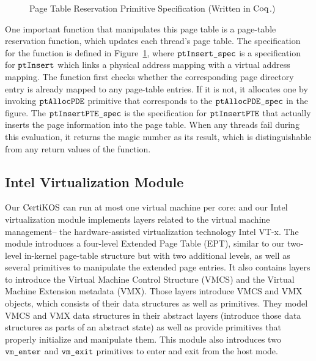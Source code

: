  \begin{figure}
 
\caption{Page Table Reservation Primitive Specification (Written in $\mathrm{Coq}$.)}
\label{fig:chapter:certikos:ptresv-func}
\end{figure}
 One important function that manipulates this page table is a page-table reservation function,
 which updates each thread's page table.
 The specification for the function is defined in Figure~\ref{fig:chapter:certikos:ptresv-func},
  where  ${\mathrm{\texttt{ptInsert\_spec}}}$ is a specification for  ${\mathrm{\texttt{ptInsert}}}$  which links 
a physical address mapping with a virtual address mapping. 
The function first checks whether the corresponding page directory entry is already mapped to any page-table entries.
If it is not, it allocates one by invoking ${\mathrm{\texttt{ptAllocPDE}}}$ primitive that corresponds to the  ${\mathrm{\texttt{ptAllocPDE\_spec}}}$
in the figure.
The ${\mathrm{\texttt{ptInsertPTE\_spec}}}$ is the specification for  ${\mathrm{\texttt{ptInsertPTE}}}$ that actually inserts the page 
information into the page table. 
When any threads fail during this evaluation, it returns the magic number as its result, which is distinguishable from 
any return values of the function.

\subsection{Intel Virtualization Module}
\label{chapter:certikos:subsec:virtualization-module}

Our $\mathrm{CertiKOS}$ can run at most one virtual machine per  core:
and our Intel virtualization module implements layers related to the virtual machine management--
the hardware-assisted virtualization technology Intel VT-x.  
The module introduces a four-level Extended Page Table (EPT), 
similar to our two-level in-kernel page-table structure but  with two additional levels, 
as well as several primitives to manipulate the extended page entries.
It also contains layers to introduce the Virtual Machine Control Structure (VMCS) and the
 Virtual Machine Extension metadata (VMX).
Those layers introduce VMCS and VMX objects, which consists of their data structures as well as primitives. 
They model VMCS and VMX data structures  in their 
 abstract layers (introduce those data structures as parts of an abstract state)
as well as provide primitives that properly initialize and manipulate them. 
This module also introduces two ${\mathrm{\texttt{vm\_enter}}}$ and ${\mathrm{\texttt{vm\_exit}}}$ primitives to enter and exit from the host mode.

